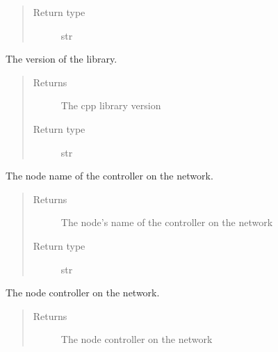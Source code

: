 \documentclass[letterpaper,10pt,english]{sphinxmanual}
\begin{document}
\begin{fulllineitems}
\begin{fulllineitems}
\begin{quote}
\begin{description}
\item[{Return type}] \leavevmode
str

\end{description}\end{quote}

\end{fulllineitems}


\begin{fulllineitems}
\label{controller:openzwave.controller.ZWaveController.library_version}
The version of the library.
\begin{quote}\begin{description}
\item[{Returns}] \leavevmode
The cpp library version

\item[{Return type}] \leavevmode
str

\end{description}\end{quote}

\end{fulllineitems}


\begin{fulllineitems}
\label{controller:openzwave.controller.ZWaveController.name}
The node name of the controller on the network.
\begin{quote}\begin{description}
\item[{Returns}] \leavevmode
The node's name of the controller on the network

\item[{Return type}] \leavevmode
str

\end{description}\end{quote}

\end{fulllineitems}


\begin{fulllineitems}
\label{controller:openzwave.controller.ZWaveController.node}
The node controller on the network.
\begin{quote}\begin{description}
\item[{Returns}] \leavevmode
The node controller on the network


\end{description}
\end{quote}
\end{fulllineitems}
\end{fulllineitems}
\end{document}
